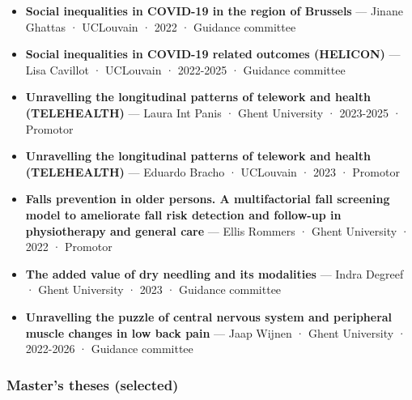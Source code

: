 \documentclass[
  letterpaper,
  DIV=11,
  numbers=noendperiod]{scrartcl}
\providecommand{\tightlist}{%
  \setlength{\itemsep}{0pt}\setlength{\parskip}{0pt}}\usepackage{longtable,booktabs,array}
\begin{document}
\begin{itemize}
\tightlist
\item
  \textbf{Social inequalities in COVID-19 in the region of Brussels} ---
  Jinane Ghattas · UCLouvain · 2022 · Guidance committee
\item
  \textbf{Social inequalities in COVID-19 related outcomes (HELICON)}
  --- Lisa Cavillot · UCLouvain · 2022-2025 · Guidance committee
\item
  \textbf{Unravelling the longitudinal patterns of telework and health
  (TELEHEALTH)} --- Laura Int Panis · Ghent University · 2023-2025 ·
  Promotor
\item
  \textbf{Unravelling the longitudinal patterns of telework and health
  (TELEHEALTH)} --- Eduardo Bracho · UCLouvain · 2023 · Promotor
\item
  \textbf{Falls prevention in older persons. A multifactorial fall
  screening model to ameliorate fall risk detection and follow-up in
  physiotherapy and general care} --- Ellis Rommers · Ghent University ·
  2022 · Promotor
\item
  \textbf{The added value of dry needling and its modalities} --- Indra
  Degreef · Ghent University · 2023 · Guidance committee
\item
  \textbf{Unravelling the puzzle of central nervous system and
  peripheral muscle changes in low back pain} --- Jaap Wijnen · Ghent
  University · 2022-2026 · Guidance committee
\end{itemize}

\subsubsection{Master's theses
(selected)}\label{masters-theses-selected}
\end{document}
